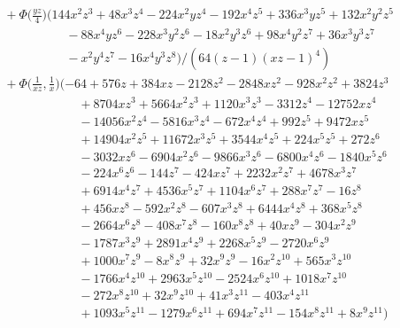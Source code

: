 \documentclass[letter,11pt,DIV=12,abstract=true,numbers=noenddot,titlepage=false,twocolumn=false,draft=false]{scrartcl}
\begin{document}
\begin{equation}
\begin{split}
& \quad + \Phi\bigg(\frac{yz}{4}\bigg) (144 x^2 z^3 + 48 x^3 z^4 - 224 x^2 y z^4 - 192 x^4 z^5 + 336 x^3 y z^5 + 
    132 x^2 y^2 z^5\\
      & \qquad \qquad \qquad - 88 x^4 y z^6 - 228 x^3 y^2 z^6 - 18 x^2 y^3 z^6 + 98 x^4 y^2 z^7 + 36 x^3 y^3 z^7\\
      & \qquad \qquad \qquad - x^2 y^4 z^7 - 16 x^4 y^3 z^8)/(64 (z-1) (x z-1)^4)\\
& \quad + \Phi\bigg(\frac{1}{xz}, \frac{1}{x}\bigg) (-64 + 576 z + 384 x z - 2128 z^2 - 2848 x z^2 - 928 x^2 z^2 + 3824 z^3\\
      & \qquad \qquad \qquad \quad + 8704 x z^3 + 5664 x^2 z^3 + 1120 x^3 z^3 - 3312 z^4 - 12752 x z^4\\
      & \qquad \qquad \qquad \quad - 14056 x^2 z^4 - 5816 x^3 z^4 - 672 x^4 z^4 + 992 z^5 + 9472 x z^5\\
      & \qquad \qquad \qquad \quad + 14904 x^2 z^5 + 11672 x^3 z^5 + 3544 x^4 z^5 + 224 x^5 z^5 + 272 z^6\\
      & \qquad \qquad \qquad \quad - 3032 x z^6 - 6904 x^2 z^6 - 9866 x^3 z^6 - 6800 x^4 z^6 - 1840 x^5 z^6\\
      & \qquad \qquad \qquad \quad - 224 x^6 z^6 - 144 z^7 - 424 x z^7 + 2232 x^2 z^7 + 4678 x^3 z^7\\
      & \qquad \qquad \qquad \quad + 6914 x^4 z^7 + 4536 x^5 z^7 + 1104 x^6 z^7 + 288 x^7 z^7 - 16 z^8\\
      & \qquad \qquad \qquad \quad + 456 x z^8 - 592 x^2 z^8 - 607 x^3 z^8 + 6444 x^4 z^8 + 368 x^5 z^8\\
      & \qquad \qquad \qquad \quad - 2664 x^6 z^8 - 408 x^7 z^8 - 160 x^8 z^8 + 40 x z^9 - 304 x^2 z^9\\
      & \qquad \qquad \qquad \quad - 1787 x^3 z^9 + 2891 x^4 z^9 + 2268 x^5 z^9 - 2720 x^6 z^9\\
      & \qquad \qquad \qquad \quad + 1000 x^7 z^9 - 8 x^8 z^9 + 32 x^9 z^9 - 16 x^2 z^{10} + 565 x^3 z^{10}\\
      & \qquad \qquad \qquad \quad - 1766 x^4 z^{10} + 2963 x^5 z^{10} - 2524 x^6 z^{10} + 1018 x^7 z^{10}\\
      & \qquad \qquad \qquad \quad - 272 x^8 z^{10} + 32 x^9 z^{10} + 41 x^3 z^{11} - 403 x^4 z^{11}\\
      & \qquad \qquad \qquad \quad + 1093 x^5 z^{11} - 1279 x^6 z^{11} + 694 x^7 z^{11} - 154 x^8 z^{11} + 8 x^9 z^{11})\\

\end{split}
\end{equation}
\end{document}
